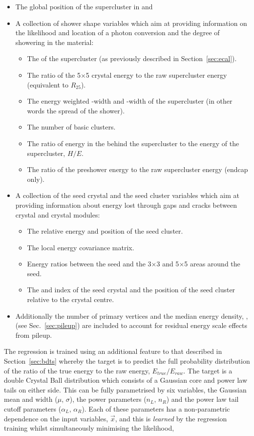 \begin{itemize}
  \item The global position of the supercluster in \eta and \phi
  \item A collection of shower shape variables which aim at providing information on the likelihood and location of a photon conversion and the degree of showering in the material:
  \begin{itemize}
    \item The \rnine of the supercluster (as previously described in Section~\ref{sec:ecal}).
    \item The ratio of the 5$\times$5 crystal energy to the raw supercluster energy (equivalent to $R_{25}$).
    \item The energy weighted \eta-width and \phi-width of the supercluster (in other words the spread of the shower).
    \item The number of basic clusters.
    \item The ratio of energy in the \HCAL behind the supercluster to the \ECAL energy of the supercluster, $H/E$.
    \item The ratio of the preshower energy to the raw supercluster energy (endcap only).
  \end{itemize}
  \item A collection of the seed crystal and the seed cluster variables which aim at providing information about energy lost through gaps and cracks between crystal and crystal modules:
  \begin{itemize}
    \item The relative energy and position of the seed cluster.
    \item The local energy covariance matrix.
    \item Energy ratios between the seed and the 3$\times$3 and 5$\times$5 areas around the seed.
    \item The \eta and \phi index of the seed crystal and the position of the seed cluster relative to the crystal centre. 
  \end{itemize}
  \item Additionally the number of primary vertices and the median energy density, \rho, (see Sec.~\ref{sec:pileup}) are included to account for residual energy scale effects from pileup.
\end{itemize}
The regression is trained using an additional feature to that described in Section~\ref{sec:bdts} whereby the target is to predict the full probability distribution of the ratio of the true energy to the raw energy, $E_{true}/E_{raw}$. The target is a double Crystal Ball distribution which consists of a Gaussian core and power law tails on either side. This can be fully parametrised by six variables, the Gaussian mean and width ($\mu$, $\sigma$), the power parameters ($n_{L}$, $n_{R}$) and the power law tail cutoff parameters ($\alpha_{L}$, $\alpha_{R}$). Each of these parameters has a non-parametric dependence on the input variables, $\vec{x}$, and this is \emph{learned} by the regression training whilst simultaneously minimising the likelihood,

